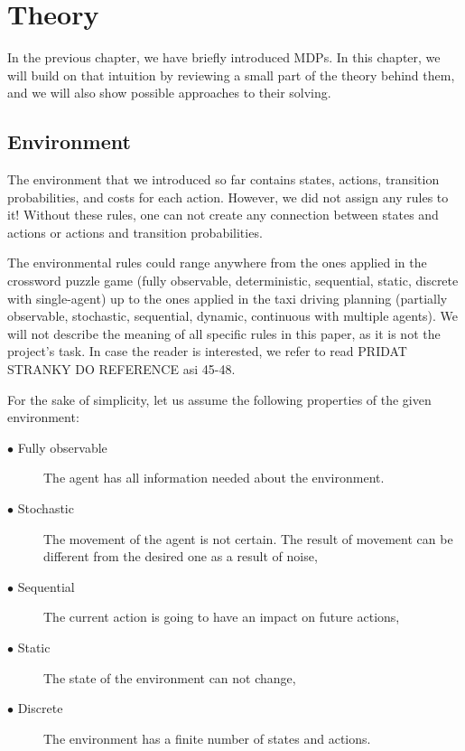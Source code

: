 
\chapter{Theory}

In the previous chapter, we have briefly introduced MDPs. In this chapter, we will build on that intuition by reviewing a small part of the theory behind them, and we will also show possible approaches to their solving.

\section{Environment}
The environment that we introduced so far contains states, actions, transition probabilities, and costs for each action. However, we did not assign any rules to it! 
Without these rules, one can not create any connection between states and actions or actions and transition probabilities.

The environmental rules could range anywhere from the ones applied in the crossword puzzle game (fully observable, deterministic, sequential, static, discrete with single-agent) up to the ones applied in the taxi driving planning (partially observable, stochastic, sequential, dynamic, continuous with multiple agents). We will not describe the meaning of all specific rules in this paper, as it is not the project's task. In case the reader is interested, we refer to read  \cite{russel2010} PRIDAT STRANKY DO REFERENCE asi 45-48.

\newpage


For the sake of simplicity, let us assume the following properties of the given environment:
\begin{description}
  \item[$\bullet$ Fully observable] The agent has all information needed about the environment.
  \item[$\bullet$ Stochastic] The movement of the agent is not certain. The result of movement can be different from the desired one as a result of noise,
  \item[$\bullet$ Sequential] The current action is going to have an impact on future actions,
  \item[$\bullet$ Static] The state of the environment can not change,
  \item[$\bullet$ Discrete] The environment has a finite number of states and actions.
\end{description}



